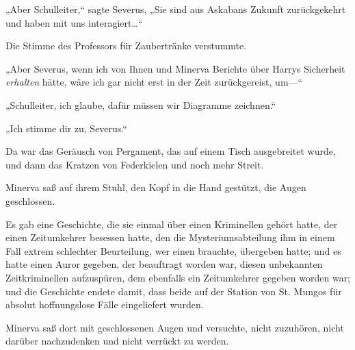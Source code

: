 „Aber Schulleiter,“ sagte Severus, „Sie sind aus Askabans Zukunft zurückgekehrt und haben mit uns interagiert…“

Die Stimme des Professors für Zaubertränke verstummte.

„Aber Severus, wenn ich von Ihnen und Minerva Berichte über Harrys Sicherheit \emph{erhalten} hätte, wäre ich gar nicht erst in der Zeit zurückgereist, um—“

„Schulleiter, ich glaube, dafür müssen wir Diagramme zeichnen.“

„Ich stimme dir zu, Severus.“

Da war das Geräusch von Pergament, das auf einem Tisch ausgebreitet wurde, und dann das Kratzen von Federkielen und noch mehr Streit.

Minerva saß auf ihrem Stuhl, den Kopf in die Hand gestützt, die Augen geschlossen.

Es gab eine Geschichte, die sie einmal über einen Kriminellen gehört hatte, der einen Zeitumkehrer besessen hatte, den die Mysteriumsabteilung ihm in einem Fall extrem schlechter Beurteilung, wer einen brauchte, übergeben hatte; und es hatte einen Auror gegeben, der beauftragt worden war, diesen unbekannten Zeitkriminellen aufzuspüren, dem ebenfalls ein Zeitumkehrer gegeben worden war; und die Geschichte endete damit, dass beide auf der Station von St. Mungos für absolut hoffnungslose Fälle eingeliefert wurden.

Minerva saß dort mit geschlossenen Augen und versuchte, nicht zuzuhören, nicht darüber nachzudenken und nicht verrückt zu werden.

